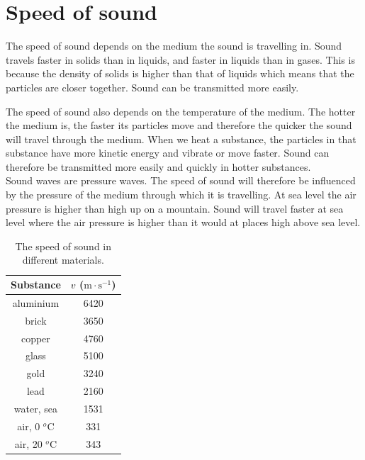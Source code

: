     \label{m38799*cid3}
            \section{Speed of sound}
            \nopagebreak
      \label{m38799*id183885}The speed of sound depends on the medium the sound is travelling in. Sound travels faster in solids than in liquids, and faster in liquids than in gases. This is because the density of solids is higher than that of liquids which means that the particles are closer together. Sound can be transmitted more easily.\par 
{}
\begin{minipage}[t]{.5\textwidth}
      \label{m38799*id183891}The speed of sound also depends on the temperature of the medium. The hotter the medium is, the faster its particles move and therefore the quicker the sound will travel through the medium. When we heat a substance, the particles in that substance have more kinetic energy and vibrate or move faster. Sound can therefore be transmitted more easily and quickly in hotter substances.\\

 
      \label{m38799*id183897}Sound waves are pressure waves. The speed of sound will therefore be influenced by the pressure of the medium through which it is travelling. At sea level the air pressure is higher than high up on a mountain. Sound will travel faster at sea level where the air pressure is higher than it would at places high above sea level.\par 
\end{minipage}
\begin{minipage}[t]{.5\textwidth}
\begin{center}
\begin{table}[H]
\centering
 \begin{tabular}{|c|c|}\hline
Substance	& $v$ ($\text{m}\cdot \text{s}^{-1}$)\\ \hline \hline
aluminium	&6420 \\ \hline
brick	&3650 \\ \hline
copper	&4760	 	 \\ \hline
glass &5100	 \\ \hline 	 	 
gold	&3240	 \\ \hline 	
lead	&2160	 \\ \hline 
water, sea	&1531 \\ \hline
air, 0 $^o$C&331 \\ \hline
air, 20 $^o$C&343 \\ \hline
\end{tabular}
\caption{The speed of sound in different materials.}
\end{table}
\end{center}
\end{minipage}


